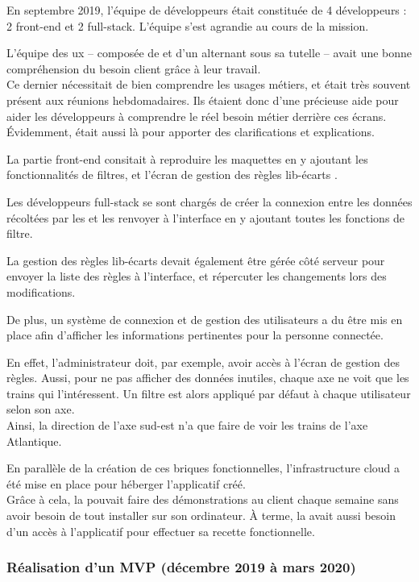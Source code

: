 En septembre 2019, l'équipe de développeurs était constituée de 4 développeurs : 2 \gls{front-end} et 2 \gls{full-stack}. L'équipe s'est agrandie au cours de la mission.

L'équipe des \gls{ux} -- composée de \stefan et d'un alternant sous sa tutelle -- avait une bonne compréhension du besoin client grâce à leur travail.\\
Ce dernier nécessitait de bien comprendre les usages métiers, et \stefan était très souvent présent aux réunions hebdomadaires. Ils étaient donc d'une précieuse aide pour aider les développeurs à comprendre le réel besoin métier derrière ces écrans.\\
Évidemment, \damien était aussi là pour apporter des clarifications et explications.


La partie \gls{front-end} consitait à reproduire les maquettes en y ajoutant les fonctionnalités de filtres, et l'écran de gestion des règles \og lib-écarts \fg.


Les développeurs \gls{full-stack} se sont chargés de créer la connexion entre les données récoltées par les \ds et les renvoyer à l'interface en y ajoutant toutes les fonctions de filtre.

La gestion des règles lib-écarts devait également être gérée côté serveur pour envoyer la liste des règles à l'interface, et répercuter les changements lors des modifications.


De plus, un système de connexion et de gestion des utilisateurs a du être mis en place afin d'afficher les informations pertinentes pour la personne connectée.

En effet, l'administrateur doit, par exemple, avoir accès à l'écran de gestion des règles. Aussi, pour ne pas afficher des données inutiles, chaque axe ne  voit que les trains qui l'intéressent. Un filtre est alors appliqué par défaut à chaque utilisateur selon son axe.\\
Ainsi, la direction de l'axe sud-est n'a que faire de voir les trains de l'axe Atlantique.


En parallèle de la création de ces briques fonctionnelles, l'infrastructure cloud a été mise en place pour héberger l'applicatif créé.\\
Grâce à cela, la \df pouvait faire des démonstrations au client chaque semaine sans avoir besoin de tout installer sur son ordinateur. À terme, la \sncf avait aussi besoin d'un accès à l'applicatif pour effectuer sa recette fonctionnelle.

\newpage
\subsubsection{Réalisation d'un MVP (décembre 2019 à mars 2020)}

